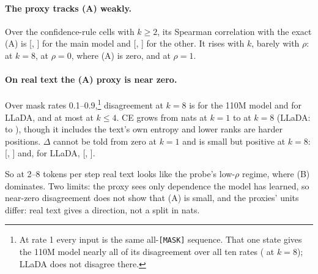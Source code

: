 \paragraph{The proxy tracks (A) weakly.}
Over the \CTwoTTenProbeNCells{} confidence-rule cells with $k\ge 2$, its Spearman
correlation with the exact (A) is \CTwoTTenProbeSpearman{} [\CTwoTTenProbeSpearmanLo,
\CTwoTTenProbeSpearmanHi] for the main model and \CTwoTTenAltProbeSpearman{}
[\CTwoTTenAltProbeSpearmanLo, \CTwoTTenAltProbeSpearmanHi] for the other. It rises with $k$,
barely with $\rho$: at $k=8$, \CTwoTTenProbeDisatRhoZeroKEight{} at $\rho=0$, where (A) is zero,
and \CTwoTTenProbeDisatRhoOneKEight{} at $\rho=1$.

\paragraph{On real text the (A) proxy is near zero.}
Over mask rates 0.1--0.9,\footnote{At rate 1 every input is the same all-\texttt{[MASK]}
sequence. That one state gives the 110M model nearly all of its disagreement over all ten
rates (\CTwoTTenDisAllRatesKEight{} at $k=8$); LLaDA does not disagree there.}
disagreement at $k=8$ is \CTwoTTenDisKEight{} for the 110M model and \CTwoTTenLladaDisKEight{}
for LLaDA, and at most \CTwoTTenDisKFour{} at $k\le4$. CE grows from \CTwoTTenCEKOne{} nats at
$k=1$ to \CTwoTTenCEKEight{} at $k=8$ (LLaDA: \CTwoTTenLladaCEKOne{} to
\CTwoTTenLladaCEKEight), though it includes the text's own entropy and lower ranks are harder
positions. $\Delta$ cannot be told from zero at $k=1$ and is small but positive at $k=8$:
\CTwoTTenDeltaKEight{} [\CTwoTTenDeltaKEightLo, \CTwoTTenDeltaKEightHi] and, for LLaDA,
\CTwoTTenLladaDeltaKEight{} [\CTwoTTenLladaDeltaKEightLo, \CTwoTTenLladaDeltaKEightHi].

So at 2--8 tokens per step real text looks like the probe's low-$\rho$ regime, where (B)
dominates. Two limits: the proxy sees only dependence the model has learned, so near-zero
disagreement does not show that (A) is small, and the proxies' units differ: real text gives a
direction, not a split in nats.
